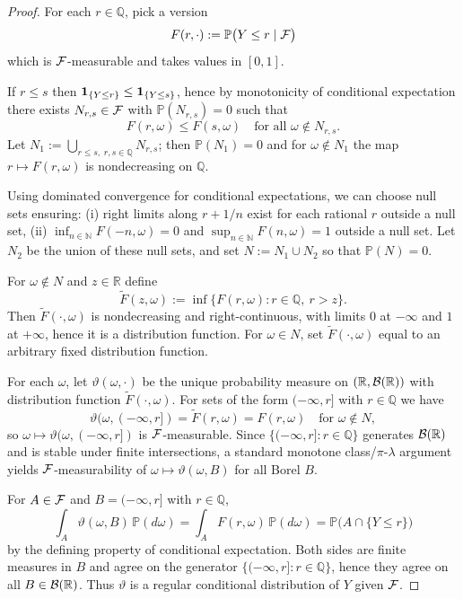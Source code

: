 \begin{proof}
For each $r\in\mathbb{Q}$, pick a version
\[
F(r,\cdot) := \mathbb{P}\big(Y\le r\mid \mathcal{F}\big)
\]
which is $\mathcal{F}$-measurable and takes values in $[0,1]$.

If $r\le s$ then $\mathbf{1}_{\{Y\le r\}}\le \mathbf{1}_{\{Y\le s\}}$, hence by monotonicity of conditional expectation
there exists $N_{r,s}\in\mathcal{F}$ with $\mathbb{P}(N_{r,s})=0$ such that
\[
F(r,\omega)\le F(s,\omega)\quad\text{for all }\omega\notin N_{r,s}.
\]
Let $N_1:=\bigcup_{r\le s,\; r,s\in\mathbb{Q}}N_{r,s}$; then $\mathbb{P}(N_1)=0$ and for $\omega\notin N_1$ the map
$r\mapsto F(r,\omega)$ is nondecreasing on $\mathbb{Q}$.

Using dominated convergence for conditional expectations, we can choose null sets ensuring:
(i) right limits along $r+1/n$ exist for each rational $r$ outside a null set,
(ii) $\inf_{n\in\mathbb{N}}F(-n,\omega)=0$ and $\sup_{n\in\mathbb{N}}F(n,\omega)=1$ outside a null set.
Let $N_2$ be the union of these null sets, and set $N:=N_1\cup N_2$ so that $\mathbb{P}(N)=0$.

For $\omega\notin N$ and $z\in\mathbb{R}$ define
\[
\widetilde F(z,\omega):=\inf\{F(r,\omega): r\in\mathbb{Q},\ r>z\}.
\]
Then $\widetilde F(\cdot,\omega)$ is nondecreasing and right-continuous, with limits $0$ at $-\infty$ and $1$ at $+\infty$,
hence it is a distribution function. For $\omega\in N$, set $\widetilde F(\cdot,\omega)$ equal to an arbitrary fixed distribution function.

For each $\omega$, let $\vartheta(\omega,\cdot)$ be the unique probability measure on $(\mathbb{R},\mathcal{B}(\mathbb{R}))$
with distribution function $\widetilde F(\cdot,\omega)$.
For sets of the form $(-\infty,r]$ with $r\in\mathbb{Q}$ we have
\[
\vartheta(\omega,(-\infty,r])=\widetilde F(r,\omega)=F(r,\omega)\quad\text{for }\omega\notin N,
\]
so $\omega\mapsto \vartheta(\omega,(-\infty,r])$ is $\mathcal{F}$-measurable.
Since $\{(-\infty,r]:r\in\mathbb{Q}\}$ generates $\mathcal{B}(\mathbb{R})$ and is stable under finite intersections,
a standard monotone class/$\pi$-$\lambda$ argument yields $\mathcal{F}$-measurability of $\omega\mapsto \vartheta(\omega,B)$ for all Borel $B$.

For $A\in\mathcal{F}$ and $B=(-\infty,r]$ with $r\in\mathbb{Q}$,
\[
\int_A \vartheta(\omega,B)\,\mathbb{P}(d\omega)=\int_A F(r,\omega)\,\mathbb{P}(d\omega)
= \mathbb{P}\big(A\cap\{Y\le r\}\big)
\]
by the defining property of conditional expectation.
Both sides are finite measures in $B$ and agree on the generator $\{(-\infty,r]: r\in\mathbb{Q}\}$, hence they agree on all $B\in\mathcal{B}(\mathbb{R})$.
Thus $\vartheta$ is a regular conditional distribution of $Y$ given $\mathcal{F}$.
\end{proof}

